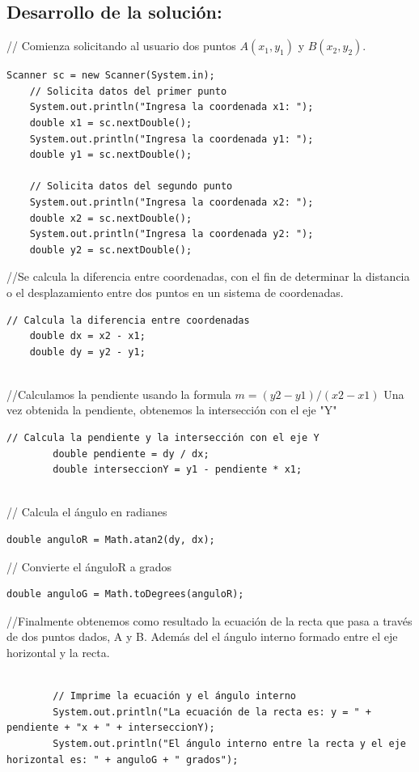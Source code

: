 \subsection{\textbf{Desarrollo de la solución:}}
// Comienza solicitando al usuario dos puntos $A(x_{1}, y_{1})$ y $B(x_{2}, y_{2})$.

\begin{lstlisting}[style=javaStyle]
    Scanner sc = new Scanner(System.in);
    // Solicita datos del primer punto
    System.out.println("Ingresa la coordenada x1: ");
    double x1 = sc.nextDouble();
    System.out.println("Ingresa la coordenada y1: ");
    double y1 = sc.nextDouble();
        
    // Solicita datos del segundo punto
    System.out.println("Ingresa la coordenada x2: ");
    double x2 = sc.nextDouble();
    System.out.println("Ingresa la coordenada y2: ");
    double y2 = sc.nextDouble();
\end{lstlisting}
//Se  calcula la diferencia entre coordenadas, con el fin de determinar la distancia o el desplazamiento entre dos puntos en un sistema de coordenadas.
\begin{lstlisting}[style=javaStyle]
    // Calcula la diferencia entre coordenadas
    double dx = x2 - x1;
    double dy = y2 - y1;
        
\end{lstlisting}
//Calculamos la pendiente usando la  formula 
 $m = (y2-y1) / (x2-x1)$
Una vez obtenida la pendiente, obtenemos la intersección con el eje "Y"
\begin{lstlisting}[style=javaStyle]
        // Calcula la pendiente y la intersección con el eje Y
        double pendiente = dy / dx;
        double interseccionY = y1 - pendiente * x1;
        
\end{lstlisting}
    // Calcula el ángulo en radianes
        
\begin{lstlisting}[style=javaStyle]
     double anguloR = Math.atan2(dy, dx);
\end{lstlisting}
    // Convierte el ánguloR a grados
\begin{lstlisting}[style=javaStyle]
    double anguloG = Math.toDegrees(anguloR);
\end{lstlisting}
    //Finalmente obtenemos como resultado la ecuación de la recta que pasa a través de dos puntos dados, A y B. 
    Además del el ángulo interno formado entre el eje horizontal y la recta.
\begin{lstlisting}[style=javaStyle]
    
        // Imprime la ecuación y el ángulo interno
        System.out.println("La ecuación de la recta es: y = " + pendiente + "x + " + interseccionY);
        System.out.println("El ángulo interno entre la recta y el eje horizontal es: " + anguloG + " grados");

\end{lstlisting}

